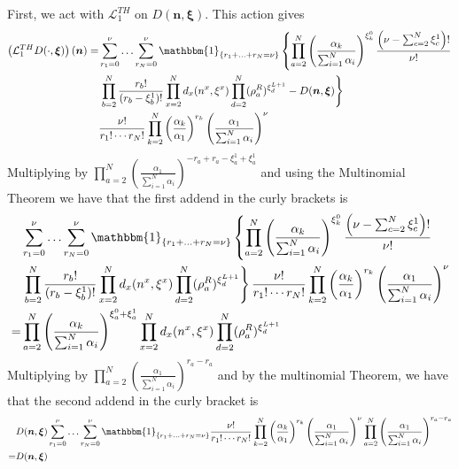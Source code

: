 \documentclass[11pt]{article}
\numberwithin{equation}{section}
\numberwithin{equation}{subsection}
\begin{document}
First, we act with $\mathcal{L}_{1}^{TH}$ on $D(\bm{n},\bm{\xi})$. This action gives
\begin{align}\label{ProvaBordoTH}
	\left(\mathcal{L}_{1}^{TH}D(\cdot,\bm{\xi})\right)(\bm{n})=\nonumber&\sum_{r_{1}=0}^{\nu}\ldots\sum_{r_{N}=0}^{\nu}\mathbbm{1}_{\{r_{1}+\ldots+r_{N}=\nu\}}\left\{\prod_{a=2}^{N}\left(\frac{\alpha_{k}}{\sum_{i=1}^{N}\alpha_{i}}\right)^{\xi_{k}^{0}}\frac{\left(\nu-\sum_{c=2}^{N}\xi_{c}^{1}\right)!}{\nu!}\right.
	\\&\nonumber
	\left.\prod_{b=2}^{N}\frac{r_{b}!}{(r_{b}-\xi^{1}_{b})!}\prod_{x=2}^{N}d_{x}(n^{x},\xi^{x})\prod_{d=2}^{N}(\rho_{a}^{R})^{\xi_{d}^{L+1}}-D(\bm{n},\bm{\xi})\right\}
	\\&
	\frac{\nu!}{r_{1}!\cdots r_{N}!}\prod_{k=2}^{N}\left(\frac{\alpha_{k}}{\alpha_{1}}\right)^{r_{k}}\left(\frac{\alpha_{1}}{\sum_{i=1}^{N}\alpha_{i}}\right)^{\nu}
\end{align}
Multiplying by $\prod_{a=2}^{N}\left(\frac{\alpha_{1}}{\sum_{i=1}^{N}\alpha_{i}}\right)^{-r_{a}+r_{a}-\xi_{a}^{1}+\xi_{a}^{1}}$ and using the Multinomial Theorem we have that the first addend in the curly brackets is
\begin{align}\label{pezzo1}
	&\sum_{r_{1}=0}^{\nu}\ldots\sum_{r_{N}=0}^{\nu}\mathbbm{1}_{\{r_{1}+\ldots+r_{N}=\nu\}}\left\{\prod_{a=2}^{N}\left(\frac{\alpha_{k}}{\sum_{i=1}^{N}\alpha_{i}}\right)^{\xi_{k}^{0}}\frac{\left(\nu-\sum_{c=2}^{N}\xi_{c}^{1}\right)!}{\nu!}\right.\nonumber
	\\&\nonumber
	\left.\prod_{b=2}^{N}\frac{r_{b}!}{(r_{b}-\xi^{1}_{b})!}\prod_{x=2}^{N}d_{x}(n^{x},\xi^{x})\prod_{d=2}^{N}(\rho_{a}^{R})^{\xi_{d}^{L+1}}\right\}	\frac{\nu!}{r_{1}!\cdots r_{N}!}\prod_{k=2}^{N}\left(\frac{\alpha_{k}}{\alpha_{1}}\right)^{r_{k}}\left(\frac{\alpha_{1}}{\sum_{i=1}^{N}\alpha_{i}}\right)^{\nu}\\=&
	\prod_{a=2}^{N}\left(\frac{\alpha_{k}}{\sum_{i=1}^{N}\alpha_{i}}\right)^{\xi_{a}^{0}+\xi_{a}^{1}}\prod_{x=2}^{N}d_{x}(n^{x},\xi^{x})\prod_{d=2}^{N}(\rho_{a}^{R})^{\xi_{d}^{L+1}}
\end{align}
Multiplying by $\prod_{a=2}^{N}\left(\frac{\alpha_{1}}{\sum_{i=1}^{N}\alpha_{i}}\right)^{r_{a}-r_{a}}$ and by the multinomial Theorem, we have that the second addend in the curly bracket is
\begin{equation}\label{pezzo2}
	\begin{split}
	&D(\bm{n},\bm{\xi})\sum_{r_{1}=0}^{\nu}\ldots\sum_{r_{N}=0}^{\nu}\mathbbm{1}_{\{r_{1}+\ldots+r_{N}=\nu\}}\frac{\nu!}{r_{1}!\cdots r_{N}!}\prod_{k=2}^{N}\left(\frac{\alpha_{k}}{\alpha_{1}}\right)^{r_{k}}\left(\frac{\alpha_{1}}{\sum_{i=1}^{N}\alpha_{i}}\right)^{\nu}\prod_{a=2}^{N}\left(\frac{\alpha_{1}}{\sum_{i=1}^{N}\alpha_{i}}\right)^{r_{a}-r_{a}}\\=&D(\bm{n},\bm{\xi})
	\end{split}
\end{equation}
\end{document}
